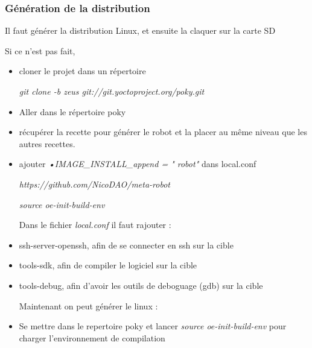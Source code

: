 \subsubsection{Génération de la distribution}
Il faut générer la distribution Linux, et ensuite la claquer sur la carte SD




Si ce n'est pas fait,
\begin{itemize}
\item 
 cloner le projet dans un répertoire


\textit{git clone -b zeus git://git.yoctoproject.org/poky.git}

\item 
Aller dans le répertoire poky

\item récupérer la recette pour générer le robot et la placer au même niveau que les autres recettes.

\item
ajouter \textit{•IMAGE\_INSTALL\_append = " robot"} dans local.conf

\textit{https://github.com/NicoDAO/meta-robot}

\textit{source oe-init-build-env}

Dans le fichier \textit{local.conf} il faut rajouter : 

\item ssh-server-openssh, afin de se connecter en ssh sur la cible
\item tools-sdk, afin de compiler le logiciel sur la cible
\item tools-debug, afin d'avoir les outils de deboguage (gdb) sur la cible




Maintenant on peut générer le linux : 
\item 
Se mettre dans le repertoire poky et lancer \textit{source oe-init-build-env} pour charger l'environnement de compilation


\end{itemize}

